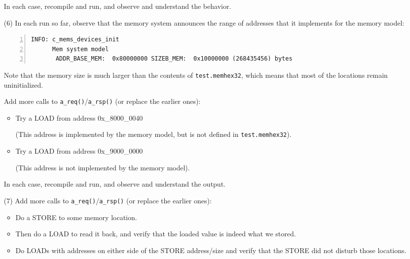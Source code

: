 \begin{itemize}
    In each case, recompile and run, and observe and understand the
    behavior.

\item[(6)] In each run so far, observe that the memory system
    announces the range of addresses that it implements for the memory
    model:

    {\footnotesize
    \begin{Verbatim}[frame=single, numbers=left]
    INFO: c_mems_devices_init
      Mem system model
       ADDR_BASE_MEM:  0x80000000 SIZEB_MEM:  0x10000000 (268435456) bytes
    \end{Verbatim}
    }

    Note that the memory size is much larger than the contents of
    \verb|test.memhex32|, which means that most of the locations
    remain uninitialized.

    Add more calls to \verb|a_req()|/\verb|a_rsp()| (or replace the
    earlier ones):

    \begin{itemize}
    \item Try a LOAD from address 0x\_8000\_0040

        (This address is implemented by the memory model, but is not
         defined in \verb|test.memhex32|).

    \item Try a LOAD from address 0x\_9000\_0000

        (This address is not implemented by the memory model).
    \end{itemize}

    In each case, recompile and run, and observe and understand the output.

\item[(7)] Add more calls to \verb|a_req()|/\verb|a_rsp()| (or replace
    the earlier ones):

    \begin{itemize}
    \item Do a STORE to some memory location.

    \item Then do a LOAD to read it back, and verify that the loaded
          value is indeed what we stored.

    \item Do LOADs with addresses on either side of the STORE address/size and
          verify that the STORE did not disturb those locations.
    \end{itemize}


\end{itemize}
